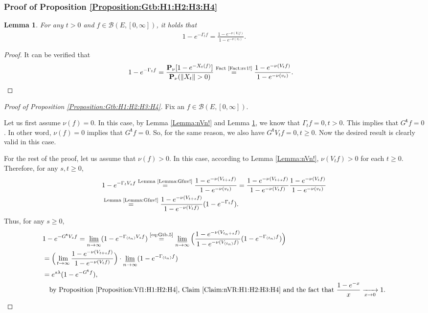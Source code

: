 \documentclass[12pt,a4paper]{amsart}
\numberwithin{equation}{section}
\theoremstyle{plain}
\newtheorem{lem}[thm]{Lemma}
\theoremstyle{definition}
\theoremstyle{remark}
\newcounter{N}
\newcounter{n}[N]
\begin{document}
\subsubsection{Proof of Proposition \ref{Proposition:Gtb:H1:H2:H3:H4}} 
\label{sec:Gtb}
\begin{lem} \label{Lemma:Gfnv!} 
For any $t > 0$ and $f\in \mathcal B(E,[0,\infty])$, it holds that
\begin{align}
 1 - e^{- \Gamma_t f} 
  = \frac{ 1 - e^{- \nu(V_tf)} }{ 1 - e^{- \nu(v_t)}}.
 \end{align}
\end{lem}
\begin{proof} 
It can be verified that
\begin{align}
 & 1 - e^{- \Gamma_t f} 
  = \frac{ \mathbf P_\nu [ 1 - e^{- X_t(f)}]}{ \mathbf P_\nu (\|X_t\| > 0)}
  \overset{\text{Fact \ref{Fact:sv1!}}}= \frac{ 1 - e^{- \nu(V_tf)} }{ 1 - e^{- \nu(v_t)}}.
  \qedhere
 \end{align}
\end{proof}
\begin{proof}[Proof of Proposition \ref{Proposition:Gtb:H1:H2:H3:H4}]
Fix an $f\in \mathcal B(E,[0,\infty])$. 

Let us first assume $\nu(f)=0$. 
In this case, by Lemma \ref{Lemma:nVn!} and Lemma \ref{Lemma:Gfnv!}, we know that $\Gamma_t f=0,t> 0$. 
This implies that $G^{\mathbf t}f = 0$. 
In other word, $\nu(f) = 0$ implies that $G^\mathbf tf = 0$.
So, for the same reason, we also have $G^{\mathbf t}V_t f = 0, t\geq 0$. 
Now the desired result is clearly valid in this case.

For the rest of the proof, let us assume that $\nu(f) > 0$. 
In this case, according to Lemma \ref{Lemma:nVn!}, $\nu(V_tf)>0$ for each $t\geq 0$. 
Therefore, for any $s,t\geq 0$,
\begin{align}
 & 1 - e^{- \Gamma_t V_s f}
 \overset{\text{Lemma \ref{Lemma:Gfnv!}}}= \frac{ 1 - e^{- \nu(V_{t+s} f)} }{ 1 - e^{- \nu(v_t)}}
 = \frac{ 1 - e^{- \nu(V_{t+s} f)} }{ 1 - e^{- \nu(V_tf)}} \frac{ 1 - e^{ - \nu(V_tf)}}{ 1 - e^{- \nu(v_t)}} 
 \\ &  \label{eq:Gtb.5}\overset{\text{Lemma \ref{Lemma:Gfnv!}}}= \frac{ 1 - e^{- \nu(V_{t+s} f)} }{ 1 - e^{- \nu(V_tf)}} ( 1 - e^{- \Gamma_t f}).
 \end{align}
Thus, for any $s\geq 0$,
\begin{align}
 & 1 - e^{- G^{\mathbf t} V_s f}
 = \varliminf_{n\to \infty} ( 1 - e^{- \Gamma_{(t_n)} V_s f})
 \overset{\text{\eqref{eq:Gtb.5}}}= \varliminf_{n\to \infty} \Big( \frac{ 1 - e^{- \nu(V_{t_n+s}f)}}{ 1 - e^{- \nu(V_{(t_n)}f)}} (1 - e^{- \Gamma_{(t_n)} f}) \Big) 
 \\& = \Big( \lim_{t \to \infty} \frac{ 1 - e^{- \nu(V_{t+s}f)}}{ 1 - e^{- \nu(V_{t}f)}} \Big) \cdot \varliminf_{n\to \infty} (1 - e^{- \Gamma_{(t_n)} f} )
 \\&= e^{s\lambda} (1 - e^{- G^{\mathbf t}f}),
 \\ &\quad\text{by Proposition \ref{Proposition:Vf1:H1:H2:H4}, Claim \ref{Claim:nVR:H1:H2:H3:H4} and the fact that $\frac{1-e^{-x}}{x} \xrightarrow[x\to 0]{} 1$.}
 \qedhere
 \end{align}
\end{proof}
\end{document}
